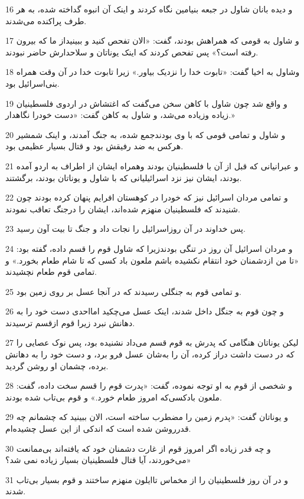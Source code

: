 \par 16 و دیده بانان شاول در جبعه بنیامین نگاه کردند و اینک آن انبوه گداخته شده، به هر طرف پراکنده می‌شدند.
\par 17 و شاول به قومی که همراهش بودند، گفت: «الان تفحص کنید و ببینیداز ما که بیرون رفته است؟» پس تفحص کردند که اینک یوناتان و سلاحدارش حاضر نبودند.
\par 18 وشاول به اخیا گفت: «تابوت خدا را نزدیک بیاور.» زیرا تابوت خدا در آن وقت همراه بنی‌اسرائیل بود.
\par 19 و واقع شد چون شاول با کاهن سخن می‌گفت که اغتشاش در اردوی فلسطینیان زیاده وزیاده می‌شد، و شاول به کاهن گفت: «دست خودرا نگاهدار.»
\par 20 و شاول و تمامی قومی که با وی بودندجمع شده، به جنگ آمدند، و اینک شمشیر هرکس به ضد رفیقش بود و قتال بسیار عظیمی بود.
\par 21 و عبرانیانی که قبل از آن با فلسطینیان بودند وهمراه ایشان از اطراف به اردو آمده بودند، ایشان نیز نزد اسرائیلیانی که با شاول و یوناتان بودند، برگشتند.
\par 22 و تمامی مردان اسرائیل نیز که خودرا در کوهستان افرایم پنهان کرده بودند چون شنیدند که فلسطینیان منهزم شده‌اند، ایشان را درجنگ تعاقب نمودند.
\par 23 پس خداوند در آن روزاسرائیل را نجات داد و جنگ تا بیت آون رسید.
\par 24 و مردان اسرائیل آن روز در تنگی بودندزیرا که شاول قوم را قسم داده، گفته بود: «تا من ازدشمنان خود انتقام نکشیده باشم ملعون باد کسی که تا شام طعام بخورد.» و تمامی قوم طعام نچشیدند.
\par 25 و تمامی قوم به جنگلی رسیدند که در آنجا عسل بر روی زمین بود.
\par 26 و چون قوم به جنگل داخل شدند، اینک عسل می‌چکید امااحدی دست خود را به دهانش نبرد زیرا قوم ازقسم ترسیدند.
\par 27 لیکن یوناتان هنگامی که پدرش به قوم قسم می‌داد نشنیده بود، پس نوک عصایی را که در دست داشت دراز کرده، آن را به‌شان عسل فرو برد، و دست خود را به دهانش برده، چشمان او روشن گردید.
\par 28 و شخصی از قوم به او توجه نموده، گفت: «پدرت قوم را قسم سخت داده، گفت: ملعون بادکسی‌که امروز طعام خورد.» و قوم بی‌تاب شده بودند.
\par 29 و یوناتان گفت: «پدرم زمین را مضطرب ساخته است، الان ببینید که چشمانم چه قدرروشن شده است که اندکی از این عسل چشیده‌ام.
\par 30 و چه قدر زیاده اگر امروز قوم از غارت دشمنان خود که یافته‌اند بی‌ممانعت می‌خوردند، آیا قتال فلسطینیان بسیار زیاده نمی شد؟»
\par 31 و در آن روز فلسطینیان را از مخماس تاایلون منهزم ساختند و قوم بسیار بی‌تاب شدند.
